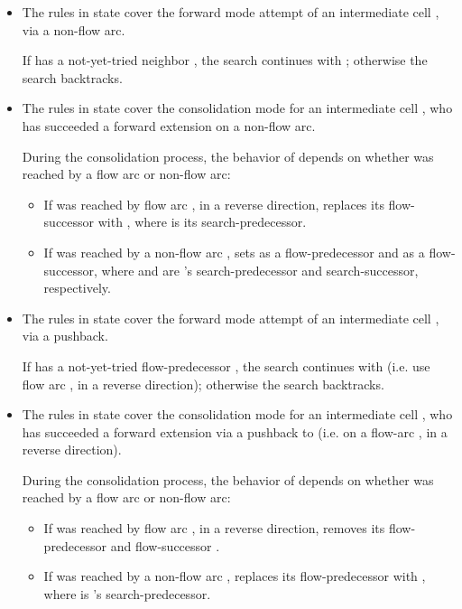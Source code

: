 \documentclass[preliminary,copyright,creativecommons]{eptcs}
\theoremstyle{remark}
\begin{document}
\begin{itemize}

\item The rules in state  cover the 
      forward mode attempt of an intermediate cell ,
      via a non-flow arc.

      If  has a not-yet-tried neighbor , 
      the search continues with ;
      otherwise the search backtracks.
      

\item The rules in state  cover the 
      consolidation mode for an intermediate cell ,
      who has succeeded a forward extension on a non-flow arc.

      During the consolidation process, the behavior of  depends on 
      whether  was reached by a flow arc or non-flow arc:
      \begin{itemize}
      \item If  was reached by flow arc , in a reverse direction,
             replaces its flow-successor  with ,
            where  is its search-predecessor.
      \item If  was reached by a non-flow arc ,
             sets  as a flow-predecessor and 
             as a flow-successor,
            where  and  are 's 
            search-predecessor and search-successor, respectively.
      \end{itemize}
      
\item The rules in state  cover the 
      forward mode attempt of an intermediate cell ,
      via a pushback.

      If  has a not-yet-tried flow-predecessor ,
      the search continues with 
      (i.e. use flow arc , in a reverse direction);
      otherwise the search backtracks.

\item The rules in state  cover the 
      consolidation mode for an intermediate cell ,
      who has succeeded a forward extension via a pushback to 
      (i.e. on a flow-arc , in a reverse direction).

      During the consolidation process, the behavior of  depends on 
      whether  was reached by a flow arc or non-flow arc:
      \begin{itemize}
      \item If  was reached by flow arc , in a reverse direction,
             removes its flow-predecessor  and 
            flow-successor .
      \item If  was reached by a non-flow arc ,
             replaces its flow-predecessor  with ,
            where  is 's search-predecessor.
      \end{itemize}
\end{itemize}
\end{document}
